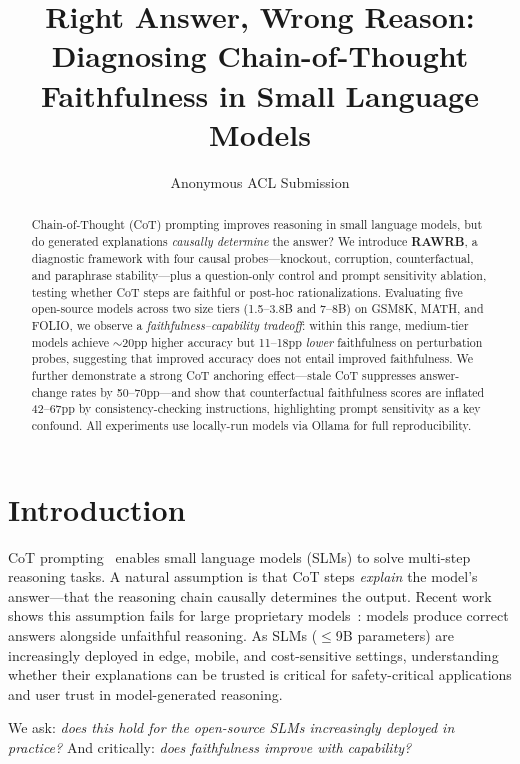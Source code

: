 \documentclass[11pt]{article}
\title{Right Answer, Wrong Reason: Diagnosing Chain-of-Thought \\
Faithfulness in Small Language Models}
\author{Anonymous ACL Submission}
\begin{document}
\maketitle

\begin{abstract}
Chain-of-Thought (CoT) prompting improves reasoning in small language models, but do generated explanations \emph{causally determine} the answer? We introduce \textbf{RAWRB}, a diagnostic framework with four causal probes---knockout, corruption, counterfactual, and paraphrase stability---plus a question-only control and prompt sensitivity ablation, testing whether CoT steps are faithful or post-hoc rationalizations. Evaluating five open-source models across two size tiers (1.5--3.8B and 7--8B) on GSM8K, MATH, and FOLIO, we observe a \emph{faithfulness--capability tradeoff}: within this range, medium-tier models achieve ${\sim}$20pp higher accuracy but 11--18pp \emph{lower} faithfulness on perturbation probes, suggesting that improved accuracy does not entail improved faithfulness. We further demonstrate a strong CoT anchoring effect---stale CoT suppresses answer-change rates by 50--70pp---and show that counterfactual faithfulness scores are inflated 42--67pp by consistency-checking instructions, highlighting prompt sensitivity as a key confound. All experiments use locally-run models via Ollama for full reproducibility.
\end{abstract}

\section{Introduction}

CoT prompting~\cite{wei2022chain} enables small language models (SLMs) to solve multi-step reasoning tasks. A natural assumption is that CoT steps \emph{explain} the model's answer---that the reasoning chain causally determines the output. Recent work shows this assumption fails for large proprietary models~\cite{turpin2024language,lanham2023measuring}: models produce correct answers alongside unfaithful reasoning. As SLMs ($\leq$9B parameters) are increasingly deployed in edge, mobile, and cost-sensitive settings, understanding whether their explanations can be trusted is critical for safety-critical applications and user trust in model-generated reasoning.

We ask: \emph{does this hold for the open-source SLMs increasingly deployed in practice?} And critically: \emph{does faithfulness improve with capability?}
\end{document}
